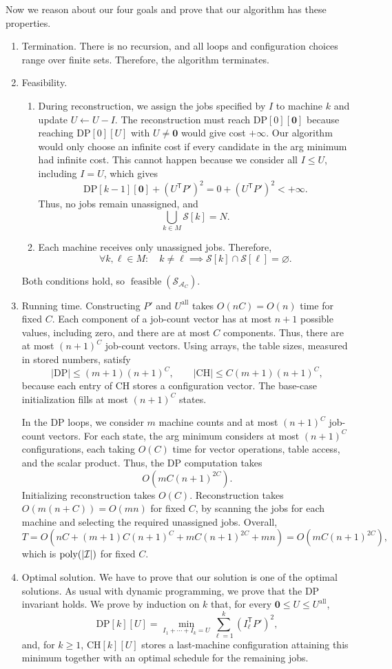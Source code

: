 \documentclass[12pt,a4paper]{article}
\theoremstyle{definition}
\theoremstyle{plain}
\begin{document}
Now we reason about our four goals and prove that our algorithm has these properties.
\begin{enumerate}
\item Termination. There is no recursion, and all loops and configuration
choices range over finite sets. Therefore, the algorithm terminates.
\item Feasibility.
\begin{enumerate}
\item During reconstruction, we assign the jobs specified by $I$ to machine
$k$ and update $U\gets U-I$. The reconstruction must reach
$\mathrm{DP}[0][\mathbf{0}]$ because reaching $\mathrm{DP}[0][U]$ with
$U\neq\mathbf{0}$ would give cost $+\infty$. Our algorithm would only
choose an infinite cost if every candidate in the arg minimum had infinite
cost. This cannot happen because we consider all $I\leq U$, including $I=U$,
which gives
\[
\mathrm{DP}[k-1][\mathbf{0}]+(U^{\mathsf T}P')^2
=0+(U^{\mathsf T}P')^2<+\infty.
\]
Thus, no jobs remain unassigned, and
\[
\bigcup_{k\in M}\mathcal{S}[k]=N.
\]
\item Each machine receives only unassigned jobs. Therefore,
\[
\forall k,\ell\in M:\quad
k\neq\ell\implies\mathcal{S}[k]\cap\mathcal{S}[\ell]=\varnothing.
\]
\end{enumerate}
Both conditions hold, so $\operatorname{feasible}(\mathcal{S}_{\mathcal{A}_C})$.
\item Running time. Constructing $P'$ and $U^{\mathrm{all}}$ takes
$O(nC)=O(n)$ time for fixed $C$. Each component of a job-count vector
has at most $n+1$ possible values, including zero, and there are at most
$C$ components. Thus, there are at most $(n+1)^C$ job-count vectors.
Using arrays, the table sizes, measured in stored numbers, satisfy
\[
|\mathrm{DP}|\leq(m+1)(n+1)^C,\qquad
|\mathrm{CH}|\leq C(m+1)(n+1)^C,
\]
because each entry of $\mathrm{CH}$ stores a configuration vector.
The base-case initialization fills at most $(n+1)^C$ states.

In the DP loops, we consider $m$ machine counts and at most $(n+1)^C$
job-count vectors. For each state, the arg minimum considers at most
$(n+1)^C$ configurations, each taking $O(C)$ time for vector operations,
table access, and the scalar product. Thus, the DP computation takes
\[
O\!\left(mC(n+1)^{2C}\right).
\]
Initializing reconstruction takes $O(C)$. Reconstruction takes $O(m(n+C))=O(mn)$
for fixed $C$, by scanning the jobs for each machine and selecting the
required unassigned jobs. Overall,
\[
T=O\!\left(nC+(m+1)C(n+1)^C+mC(n+1)^{2C}+mn\right)
=O\!\left(mC(n+1)^{2C}\right),
\]
which is $\operatorname{poly}(|\mathcal{I}|)$ for fixed $C$.
\item Optimal solution. We have to prove that our solution is one of the
optimal solutions. As usual with dynamic programming, we prove that the
DP invariant holds. We prove by induction on $k$ that, for every
$\mathbf{0}\leq U\leq U^{\mathrm{all}}$,
\[
\mathrm{DP}[k][U]
=\min_{I_1+\cdots+I_k=U}
\sum_{\ell=1}^{k}(I_\ell^{\mathsf T}P')^2,
\]
and, for $k\geq1$, $\mathrm{CH}[k][U]$ stores a last-machine
configuration attaining this minimum together with an optimal schedule
for the remaining jobs.


\end{enumerate}
\end{document}
